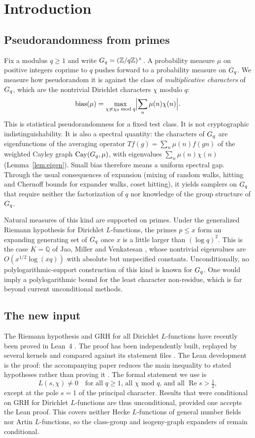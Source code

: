 \section{Introduction}\label{sec:intro}

\subsection{Pseudorandomness from primes}
Fix a modulus $q\ge 1$ and write $G_q=(\mathbb{Z}/q\mathbb{Z})^\times$. A probability measure $\mu$ on positive
integers coprime to $q$ pushes forward to a probability measure on $G_q$. We measure how
pseudorandom it is against the class of \emph{multiplicative characters} of $G_q$, which are the
nontrivial Dirichlet characters $\chi$ modulo $q$:
\[
  \operatorname{bias}(\mu)=\max_{\chi\ne\chi_0 \bmod q}\Bigl\lvert\sum_n \mu(n)\chi(n)\Bigr\rvert .
\]
This is statistical pseudorandomness for a fixed test class. It is not cryptographic
indistinguishability. It is also a spectral quantity: the characters of $G_q$ are eigenfunctions of the
averaging operator $Tf(g)=\sum_n\mu(n)f(gn)$ of the weighted Cayley graph $\mathrm{Cay}(G_q,\mu)$, with
eigenvalues $\sum_n\mu(n)\chi(n)$ (Lemma~\ref{lem:eigen}). Small bias therefore means a uniform
spectral gap. Through the usual consequences of expansion (mixing of random walks, hitting and
Chernoff bounds for expander walks, coset hitting), it yields samplers on $G_q$ that require
neither the factorization of $q$ nor knowledge of the group structure of $G_q$.

Natural measures of this kind are supported on primes. Under the generalized Riemann hypothesis for
Dirichlet $L$-functions, the primes $p\le x$ form an expanding generating set of $G_q$ once $x$ is a
little larger than $(\log q)^2$. This is the case $K=\mathbb{Q}$ of Jao, Miller and Venkatesan
\cite{jmv2009}, whose nontrivial eigenvalues are $O(x^{1/2}\log(xq))$ with absolute but unspecified
constants. Unconditionally, no polylogarithmic-support construction of this kind is known for $G_q$.
One would imply a polylogarithmic bound for the least character non-residue, which is far beyond
current unconditional methods.

\subsection{The new input}
The Riemann hypothesis and GRH for all Dirichlet $L$-functions have recently been proved in Lean~4
\cite{alpoge2026,grhlean}. The proof has been independently built, replayed by several kernels and
compared against its statement files \cite{sutherlandgrh,sutherlandshortgrh,rubinsteinpage}. The Lean
development is the proof: the accompanying paper reduces the main inequality to stated hypotheses
rather than proving it \cite{rubinsteinpage}. The formal statement we use is
\[
  L(s,\chi)\ne0\quad\text{for all $q\ge1$, all $\chi$ mod $q$, and all } \operatorname{Re}s>\tfrac12,
\]
except at the pole $s=1$ of the principal character. Results that were conditional on GRH for
Dirichlet $L$-functions are thus unconditional, provided one accepts the Lean proof. This covers
neither Hecke $L$-functions of general number fields nor Artin $L$-functions, so the class-group and
isogeny-graph expanders of \cite{jmv2009} remain conditional.

